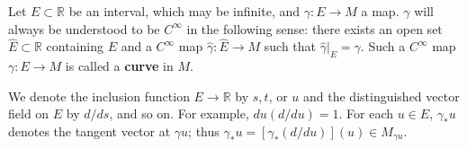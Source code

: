 Let $E \subset \mathbb{R}$ be an interval, which may be infinite, and $\gamma: E \rightarrow M$ a map. $\gamma$ will always be understood to be $C^\infty$ in the following sense: there exists an open set $\hat{E} \subset \mathbb{R}$ containing $E$ and a $C^\infty$ map $\hat{\gamma}: \hat{E} \rightarrow M$ such that $\hat{\gamma}|_E = \gamma$. Such a $C^\infty$ map $\gamma: E \rightarrow M$ is called a \textbf{curve} in $M$.

We denote the inclusion function $E \rightarrow \mathbb{R}$ by $s, t$, or $u$ and the distinguished vector field on $E$ by $d/ds$, and so on. For example, $du(d/du) = 1$. For each $u \in E$, $\gamma_* u$ denotes the tangent vector at $\gamma u$; thus $\gamma_* u = [\gamma_*(d/du)](u) \in M_{\gamma u}$.
